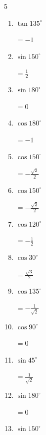 \begin{multicols}{5}
\begin{enumerate}
        $\displaystyle =-1$

  \item $\displaystyle \tan{135^\circ}$

        $\displaystyle =-1$

  \item $\displaystyle \sin{150^\circ}$

        $\displaystyle =\frac{1}{2}$

  \item $\displaystyle \sin{180^\circ}$

        $\displaystyle =0$

  \item $\displaystyle \cos{180^\circ}$

        $\displaystyle =-1$

\columnbreak %

  \item $\displaystyle \cos{150^\circ}$

        $\displaystyle =-\frac{\sqrt{3}}{2}$

  \item $\displaystyle \cos{150^\circ}$

        $\displaystyle =-\frac{\sqrt{3}}{2}$

  \item $\displaystyle \cos{120^\circ}$

        $\displaystyle =-\frac{1}{2}$

  \item $\displaystyle \cos{30^\circ}$

        $\displaystyle =\frac{\sqrt{3}}{2}$

  \item $\displaystyle \cos{135^\circ}$

        $\displaystyle =-\frac{1}{\sqrt{2}}$

  \item $\displaystyle \cos{90^\circ}$

        $\displaystyle =0$

  \item $\displaystyle \sin{45^\circ}$

        $\displaystyle =\frac{1}{\sqrt{2}}$

  \item $\displaystyle \sin{180^\circ}$

        $\displaystyle =0$

  \item $\displaystyle \sin{150^\circ}$


\end{enumerate}
\end{multicols}
